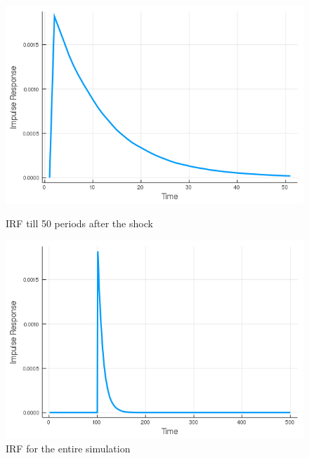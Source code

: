 \begin{figure}[H]
    \centering
    \begin{minipage}{0.48\textwidth}
        \centering
        \includegraphics[width = \textwidth]{../tasks/Calvo_Plus/output/C_irf_50_periods.png}
        \caption{IRF till 50 periods after the shock}
        \label{irf11}
    \end{minipage}
    \begin{minipage}{0.48\textwidth}
        \centering
        \includegraphics[width=\textwidth]{../tasks/Calvo_Plus/output/C_irf_500_periods.png}
        \caption{IRF for the entire simulation}
        \label{irf22}
    \end{minipage}
\end{figure}
